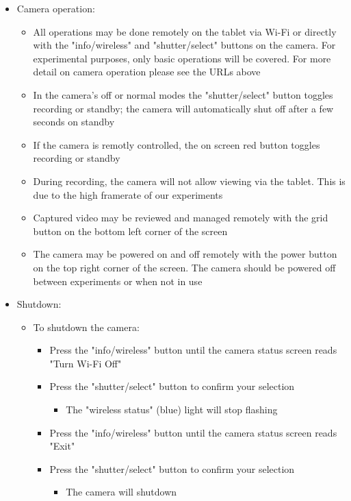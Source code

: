 \documentclass[letterpaper,11pt]{article}
\begin{document}
\begin{itemize}
    \item Camera operation:
        \begin{itemize}
        \item All operations may be done remotely on the tablet via Wi-Fi or 
            directly with the "info/wireless" and "shutter/select" buttons on 
            the camera. For experimental purposes, only basic operations
            will be covered. For more detail on camera 
            operation please see the URLs above
        \item In the camera's off or normal modes the "shutter/select" button 
            toggles recording or standby; the camera will automatically shut off
            after a few seconds on standby
        \item If the camera is remotly controlled, the on screen red button 
            toggles recording or standby
        \item During recording, the camera will not allow viewing via the 
            tablet. This is due to the high framerate of our experiments
        \item Captured video may be reviewed and managed remotely with the grid
            button on the bottom left corner of the screen
        \item The camera may be powered on and off remotely with the power  
            button on the top right corner of the screen. The camera should be 
            powered off between experiments or when not in use
        \end{itemize}
    
    \item Shutdown:
        \begin{itemize}
        \item To shutdown the camera:
            \begin{itemize}
            \item Press the "info/wireless" button 
                until the camera status screen reads "Turn Wi-Fi Off"
            \item Press the "shutter/select" button to confirm your selection
                \begin{itemize}
                \item The "wireless status" (blue) light will stop flashing
                \end{itemize}
            
            \item Press the "info/wireless" button until the camera status 
                screen reads "Exit"
            \item Press the "shutter/select" button to confirm your selection
                \begin{itemize}
                \item The camera will shutdown 
                \end{itemize}
            

\end{itemize}
\end{itemize}
\end{itemize}
\end{document}
